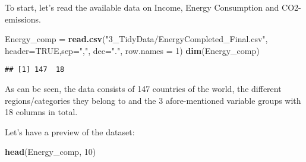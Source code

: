 \documentclass[]{article}
\newenvironment{Shaded}{\begin{snugshade}}{\end{snugshade}}
\newcommand{\KeywordTok}[1]{\textcolor[rgb]{0.13,0.29,0.53}{\textbf{#1}}}
\newcommand{\DataTypeTok}[1]{\textcolor[rgb]{0.13,0.29,0.53}{#1}}
\newcommand{\DecValTok}[1]{\textcolor[rgb]{0.00,0.00,0.81}{#1}}
\newcommand{\StringTok}[1]{\textcolor[rgb]{0.31,0.60,0.02}{#1}}
\newcommand{\OtherTok}[1]{\textcolor[rgb]{0.56,0.35,0.01}{#1}}
\newcommand{\NormalTok}[1]{#1}
\begin{document}
To start, let's read the available data on Income, Energy Consumption
and CO2-emissions.

\begin{Shaded}
\begin{Highlighting}[]
\NormalTok{Energy_comp =}\StringTok{ }\KeywordTok{read.csv}\NormalTok{(}\StringTok{"3_TidyData/EnergyCompleted_Final.csv"}\NormalTok{,}
                       \DataTypeTok{header=}\OtherTok{TRUE}\NormalTok{,}\DataTypeTok{sep=}\StringTok{","}\NormalTok{, }\DataTypeTok{dec=}\StringTok{"."}\NormalTok{, }
                       \DataTypeTok{row.names =} \DecValTok{1}\NormalTok{)}
\KeywordTok{dim}\NormalTok{(Energy_comp)}
\end{Highlighting}
\end{Shaded}

\begin{verbatim}
## [1] 147  18
\end{verbatim}

As can be seen, the data consists of 147 countries of the world, the
different regions/categories they belong to and the 3 afore-mentioned
variable groups with 18 columns in total.

Let's have a preview of the dataset:

\begin{Shaded}
\begin{Highlighting}[]
\KeywordTok{head}\NormalTok{(Energy_comp, }\DecValTok{10}\NormalTok{)}
\end{Highlighting}
\end{Shaded}
\end{document}
